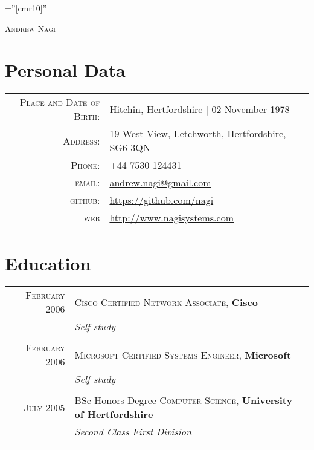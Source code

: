 \documentclass[a4paper,11pt]{article}
\begin{document}

\pagestyle{empty} %

\font\fb=''[cmr10]'' %

\par{\centering
  {\huge \textsc{Andrew Nagi}
}\bigskip\par}
\section{Personal Data}

\begin{tabular}{rl}
  \textsc{Place and Date of Birth:} & Hitchin, Hertfordshire  | 02 November 1978 \\
  \textsc{Address:}   & 19 West View, Letchworth, Hertfordshire, SG6 3QN \\
  \textsc{Phone:}     & +44 7530 124431\\
  \textsc{email:}     & \href{mailto:andrew.nagi@gmail.com}{andrew.nagi@gmail.com} \\
  \textsc{github:}     & \href{https://github.com/nagi}{https://github.com/nagi} \\
  \textsc{web}     & \href{http://www.nagisystems.com}{http://www.nagisystems.com}
\end{tabular}

\section{Education}
\begin{tabular}{rl}	
  \textsc{February} 2006 & \textsc{Cisco Certified Network Associate}, \textbf{Cisco}\\
                         & \small\emph{Self study}\\&\\
  \textsc{February} 2006 & \textsc{Microsoft Certified Systems Engineer}, \textbf{Microsoft}\\
                         & \small\emph{Self study}\\&\\
  \textsc{July} 2005 & BSc Honors Degree \textsc{Computer Science}, \textbf{University of Hertfordshire}\\
                     & \small\emph{Second Class First Division}\\&\\
\end{tabular}
\end{document}

